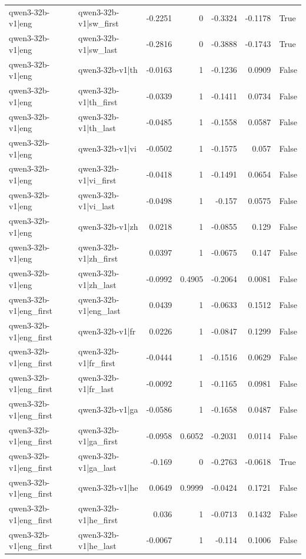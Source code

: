 \begin{table}
\begin{tabular}{l l r r r r l}
qwen3-32b-v1|eng & qwen3-32b-v1|sw_first & -0.2251 & 0 & -0.3324 & -0.1178 & True \\
qwen3-32b-v1|eng & qwen3-32b-v1|sw_last & -0.2816 & 0 & -0.3888 & -0.1743 & True \\
qwen3-32b-v1|eng & qwen3-32b-v1|th & -0.0163 & 1 & -0.1236 & 0.0909 & False \\
qwen3-32b-v1|eng & qwen3-32b-v1|th_first & -0.0339 & 1 & -0.1411 & 0.0734 & False \\
qwen3-32b-v1|eng & qwen3-32b-v1|th_last & -0.0485 & 1 & -0.1558 & 0.0587 & False \\
qwen3-32b-v1|eng & qwen3-32b-v1|vi & -0.0502 & 1 & -0.1575 & 0.057 & False \\
qwen3-32b-v1|eng & qwen3-32b-v1|vi_first & -0.0418 & 1 & -0.1491 & 0.0654 & False \\
qwen3-32b-v1|eng & qwen3-32b-v1|vi_last & -0.0498 & 1 & -0.157 & 0.0575 & False \\
qwen3-32b-v1|eng & qwen3-32b-v1|zh & 0.0218 & 1 & -0.0855 & 0.129 & False \\
qwen3-32b-v1|eng & qwen3-32b-v1|zh_first & 0.0397 & 1 & -0.0675 & 0.147 & False \\
qwen3-32b-v1|eng & qwen3-32b-v1|zh_last & -0.0992 & 0.4905 & -0.2064 & 0.0081 & False \\
qwen3-32b-v1|eng_first & qwen3-32b-v1|eng_last & 0.0439 & 1 & -0.0633 & 0.1512 & False \\
qwen3-32b-v1|eng_first & qwen3-32b-v1|fr & 0.0226 & 1 & -0.0847 & 0.1299 & False \\
qwen3-32b-v1|eng_first & qwen3-32b-v1|fr_first & -0.0444 & 1 & -0.1516 & 0.0629 & False \\
qwen3-32b-v1|eng_first & qwen3-32b-v1|fr_last & -0.0092 & 1 & -0.1165 & 0.0981 & False \\
qwen3-32b-v1|eng_first & qwen3-32b-v1|ga & -0.0586 & 1 & -0.1658 & 0.0487 & False \\
qwen3-32b-v1|eng_first & qwen3-32b-v1|ga_first & -0.0958 & 0.6052 & -0.2031 & 0.0114 & False \\
qwen3-32b-v1|eng_first & qwen3-32b-v1|ga_last & -0.169 & 0 & -0.2763 & -0.0618 & True \\
qwen3-32b-v1|eng_first & qwen3-32b-v1|he & 0.0649 & 0.9999 & -0.0424 & 0.1721 & False \\
qwen3-32b-v1|eng_first & qwen3-32b-v1|he_first & 0.036 & 1 & -0.0713 & 0.1432 & False \\
qwen3-32b-v1|eng_first & qwen3-32b-v1|he_last & -0.0067 & 1 & -0.114 & 0.1006 & False \\

\end{tabular}
\end{table}
